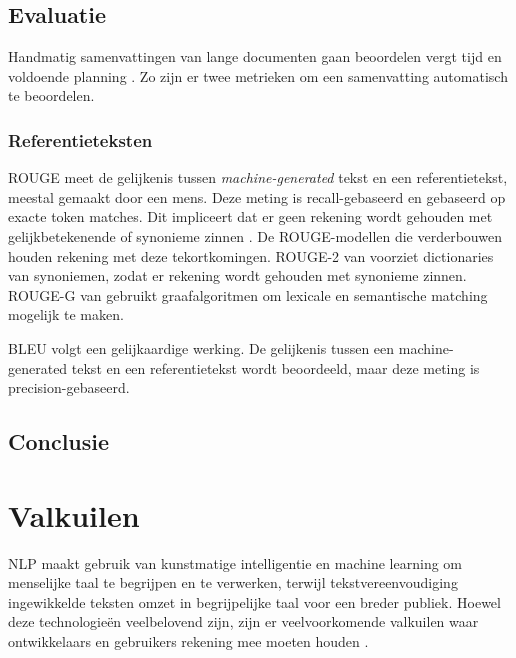 \subsection{Evaluatie}


Handmatig samenvattingen van lange documenten gaan beoordelen vergt tijd en voldoende planning \autocite{Nenkova2004}. Zo zijn er twee metrieken om een samenvatting automatisch te beoordelen.


\subsubsection{Referentieteksten}

ROUGE meet de gelijkenis tussen \textit{machine-generated} tekst en een referentietekst, meestal gemaakt door een mens. Deze meting is recall-gebaseerd en gebaseerd op exacte token matches. Dit impliceert dat er geen rekening wordt gehouden met gelijkbetekenende of synonieme zinnen \autocite{Lin2004}. De ROUGE-modellen die verderbouwen houden rekening met deze tekortkomingen. ROUGE-2 van \textcite{Ganesan2018} voorziet dictionaries van synoniemen, zodat er rekening wordt gehouden met synonieme zinnen. ROUGE-G van \textcite{ShafieiBavani2018} gebruikt graafalgoritmen om lexicale en semantische matching mogelijk te maken.

BLEU volgt een gelijkaardige werking. De gelijkenis tussen een machine-generated tekst en een referentietekst wordt beoordeeld, maar deze meting is precision-gebaseerd.




\subsection{Conclusie}


\section{Valkuilen}

NLP maakt gebruik van kunstmatige intelligentie en machine learning om menselijke taal te begrijpen en te verwerken, terwijl tekstvereenvoudiging ingewikkelde teksten omzet in begrijpelijke taal voor een breder publiek. Hoewel deze technologieën veelbelovend zijn, zijn er veelvoorkomende valkuilen waar ontwikkelaars en gebruikers rekening mee moeten houden \autocite{Sciforce2020, Roldos2020, Khurana2022}.

